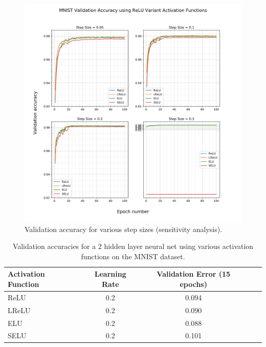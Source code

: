 \documentclass{article}
\begin{document}
\begin{figure}[tb]
\vskip 5mm
\begin{center}
\centerline{\includegraphics[width=\columnwidth]{validation_acc_sens_analysis_svg}}
\caption{Validation accuracy for various step sizes (sensitivity analysis).}
\label{fig:sens-analysis-val-acc}
\end{center}
\vskip -5mm
\end{figure}

\begin{table}[tb]
\vskip 3mm
\begin{center}
\begin{small}
\begin{sc}
\begin{tabular}{lcccr}
\hline
\abovespace\belowspace
Activation Function & Learning Rate & Validation Error (15 epochs) \\
\hline
\abovespace
ReLU    & 0.2& 0.094 \\
LReLU & 0.2& 0.090 \\
ELU    & 0.2& 0.088 \\
\belowspace
SELU    & 0.2& 0.101 \\
\hline
\end{tabular}
\end{sc}
\end{small}
\caption{Validation accuracies for a 2 hidden layer neural net using 
various activation functions on the MNIST dataset.}
\label{tab:MNIST-table}
\end{center}
\vskip -3mm
\end{table}
\end{document}
